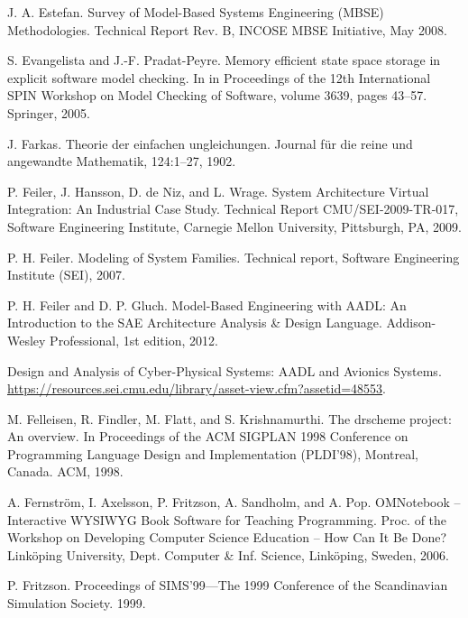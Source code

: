 \begin{description}[style=nextline,leftmargin=12mm,labelwidth=10mm,font=\normalfont]
\item[{[95]}] J. A. Estefan. Survey of Model-Based Systems Engineering (MBSE) Methodologies. Technical Report Rev. B, INCOSE MBSE Initiative, May 2008.

\item[{[96]}] S. Evangelista and J.-F. Pradat-Peyre. Memory efficient state space storage in explicit software model checking. In in Proceedings of the 12th International SPIN Workshop on Model Checking of Software, volume 3639, pages 43–57. Springer, 2005.

\item[{[97]}] J. Farkas. Theorie der einfachen ungleichungen. Journal für die reine und angewandte Mathematik, 124:1–27, 1902.

\item[{[98]}] P. Feiler, J. Hansson, D. de Niz, and L. Wrage. System Architecture Virtual Integration: An Industrial Case Study. Technical Report CMU/SEI-2009-TR-017, Software Engineering Institute, Carnegie Mellon University, Pittsburgh, PA, 2009.

\item[{[99]}] P. H. Feiler. Modeling of System Families. Technical report, Software Engineering Institute (SEI), 2007.

\item[{[100]}] P. H. Feiler and D. P. Gluch. Model-Based Engineering with AADL: An Introduction to the SAE Architecture Analysis \& Design Language. Addison-Wesley Professional, 1st edition, 2012.

\item[{[101]}] Design and Analysis of Cyber-Physical Systems: AADL and Avionics Systems. \url{https://resources.sei.cmu.edu/library/asset-view.cfm?assetid=48553}.

\item[{[102]}] M. Felleisen, R. Findler, M. Flatt, and S. Krishnamurthi. The drscheme project: An overview. In Proceedings of the ACM SIGPLAN 1998 Conference on Programming Language Design and Implementation (PLDI’98), Montreal, Canada. ACM, 1998.

\item[{[103]}] A. Fernström, I. Axelsson, P. Fritzson, A. Sandholm, and A. Pop. OMNotebook – Interactive WYSIWYG Book Software for Teaching Programming. Proc. of the Workshop on Developing Computer Science Education – How Can It Be Done? Linköping University, Dept. Computer \& Inf. Science, Linköping, Sweden, 2006.

\item[{[104]}] P. Fritzson. Proceedings of SIMS’99—The 1999 Conference of the Scandinavian Simulation Society. 1999.


\end{description}

